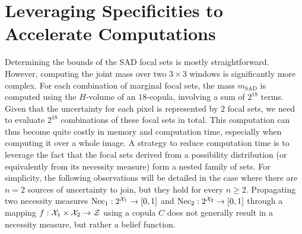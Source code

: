 \section{Leveraging Specificities to Accelerate Computations}

Determining the bounds of the SAD focal sets is mostly straightforward. However, computing the joint mass over two $3 \times 3$ windows is significantly more complex. For each combination of marginal focal sets, the mass $m_{\mathrm{SAD}}$ is computed using the $H$-volume of an $18$-copula, involving a sum of $2^{18}$ terms. Given that the uncertainty for each pixel is represented by $2$ focal sets, we need to evaluate $2^{18}$ combinations of these focal sets in total. This computation can thus become quite costly in memory and computation time, especially when computing it over a whole image. A strategy to reduce computation time is to leverage the fact that the focal sets derived from a possibility distribution (or equivalently from its necessity measure) form a nested family of sets. For simplicity, the following observations will be detailed in the case where there are $n=2$ sources of uncertainty to join, but they hold for every $n\geqslant2$. Propagating two necessity measures $\mathrm{Nec}_1:2^{{\mathcal{X}}_1} \rightarrow [0,1]$ and $\mathrm{Nec}_2: 2^{{\mathcal{X}}_2} \rightarrow [0,1]$ through a mapping $f: {\mathcal{X}}_1 \times {\mathcal{X}}_2 \rightarrow \mathcal{Z}$ using a copula $C$ does not generally result in a necessity measure, but rather a belief function.

